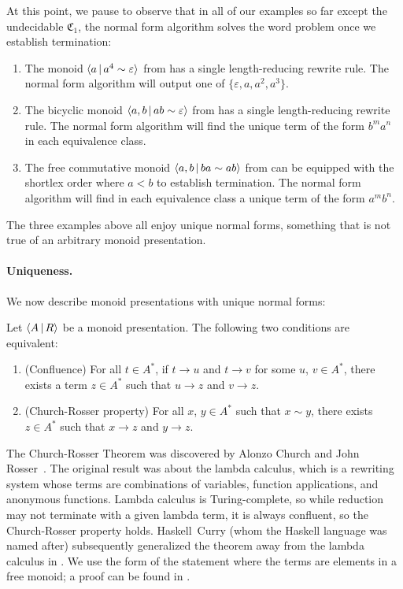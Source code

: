 \documentclass[../generics]{subfiles}
\begin{document}
At this point, we pause to observe that in all of our examples so far except the undecidable $\mathfrak{C}_1$, the normal form algorithm solves the word problem once we establish termination:
\begin{enumerate}
\item The monoid $\langle a\,|\,a^4\sim\varepsilon\rangle$ from  has a single length-reducing rewrite rule. The normal form algorithm will output one of $\{\varepsilon,a,a^2,a^3\}$.
\item The bicyclic monoid $\langle a, b\,|\,ab\sim\varepsilon\rangle$ from  has a single length-reducing rewrite rule. The normal form algorithm will find the unique term of the form $b^m a^n$ in each equivalence class.
\item The free commutative monoid $\langle a,b\,|\,ba\sim ab\rangle$ from  can be equipped with the shortlex order where $a<b$ to establish termination. The normal form algorithm will find in each equivalence class a unique term of the form $a^m b^n$.
\end{enumerate}
The three examples above all enjoy unique normal forms, something that is not true of an arbitrary monoid presentation.

\paragraph{Uniqueness.}
We now describe monoid presentations with unique normal forms:

\begin{theorem}\label{church rosser theorem}
Let $\langle A\,|\,R\rangle$ be a monoid presentation. The following two conditions are equivalent:
\begin{enumerate}
\item {}(Confluence) For all $t\in A^*$, if $t\rightarrow u$ and $t\rightarrow v$ for some $u$, $v\in A^*$, there exists a term $z\in A^*$ such that $u\rightarrow z$ and $v\rightarrow z$.
\item {}(Church-Rosser property) For all $x$, $y\in A^*$ such that $x\sim y$, there exists $z\in A^*$ such that $x\rightarrow z$ and $y\rightarrow z$.
\end{enumerate}
\end{theorem}

The Church-Rosser Theorem was discovered by Alonzo Church and John Rosser~\cite{conversion}. The original result was about the lambda calculus, which is a rewriting system whose terms are combinations of variables, function applications, and anonymous functions. Lambda calculus is Turing-complete, so while reduction may not terminate with a given lambda term, it is always confluent, so the Church-Rosser property holds. Haskell~Curry (whom the Haskell language was named after) subsequently generalized the theorem away from the lambda calculus in \cite{combinatory}. We use the form of the statement where the terms are elements in a free monoid; a proof can be found in \cite{book2012string}.
\end{document}
